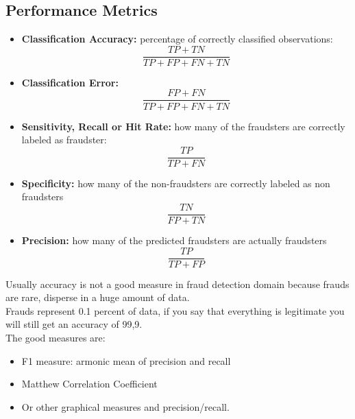     \subsection{Performance Metrics}
        \begin{itemize}
            \item \textbf{Classification Accuracy:} percentage of correctly classified observations: $$\frac{TP+TN}{TP+FP+FN+TN}$$
            \item \textbf{Classification Error:} $$\frac{FP+FN}{TP+FP+FN+TN}$$
            \item \textbf{Sensitivity, Recall or Hit Rate:} how many of the fraudsters are correctly labeled as fraudster: $$\frac{TP}{TP+FN}$$
            \item \textbf{Specificity:} how many of the non-fraudsters are correctly labeled as non fraudsters $$\frac{TN}{FP+TN}$$
            \item \textbf{Precision:} how many of the predicted fraudsters are actually fraudsters $$\frac{TP}{TP+FP}$$
        \end{itemize}
        Usually accuracy is not a good measure in fraud detection domain because frauds are rare, disperse in a huge amount of data.\\
        Frauds represent 0.1 percent of data, if you say that everything is legitimate you will still get an accuracy of 99,9.\\
        The good measures are:
        \begin{itemize}
            \item F1 measure: armonic mean of precision and recall
            \item Matthew Correlation Coefficient
            \item Or other graphical measures and precision/recall.
        \end{itemize} 
        \newpage
